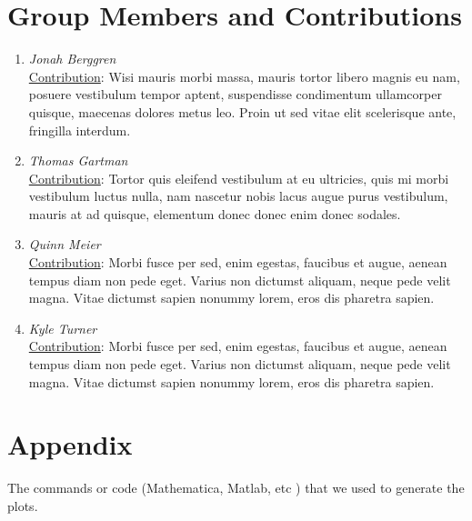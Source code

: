 \documentclass[12pt]{article}
\begin{document}
\section{Group Members and Contributions}
\begin{enumerate}
\item {\em Jonah Berggren} \\
\underline{Contribution}: Wisi mauris morbi massa, mauris tortor libero magnis eu nam, posuere vestibulum tempor aptent, suspendisse condimentum ullamcorper quisque, maecenas dolores metus leo. Proin ut sed vitae elit scelerisque ante, fringilla interdum.\\
\item {\em Thomas Gartman} \\
\underline{Contribution}: Tortor quis eleifend vestibulum at eu ultricies, quis mi morbi vestibulum luctus nulla, nam nascetur nobis lacus augue purus vestibulum, mauris at ad quisque, elementum donec donec enim donec sodales. \\
\item {\em Quinn Meier} \\
\underline{Contribution}: Morbi fusce per sed, enim egestas, faucibus et augue, aenean tempus diam non pede eget. Varius non dictumst aliquam, neque pede velit magna. Vitae dictumst sapien nonummy lorem, eros dis pharetra sapien. \\
\item {\em Kyle Turner} \\
\underline{Contribution}: Morbi fusce per sed, enim egestas, faucibus et augue, aenean tempus diam non pede eget. Varius non dictumst aliquam, neque pede velit magna. Vitae dictumst sapien nonummy lorem, eros dis pharetra sapien. \\

\end{enumerate}


\section{Appendix}

The commands or code  (Mathematica, Matlab, etc ) that we used to generate the plots.
\end{document}
